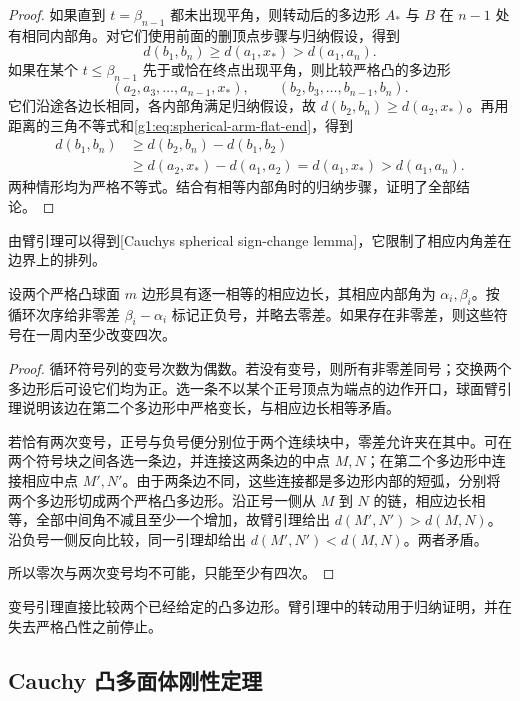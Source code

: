 \begin{proof}
	如果直到 \(t=\beta_{n-1}\) 都未出现平角，则转动后的多边形 \(A_*\) 与 \(B\) 在 \(n-1\) 处有相同内部角。对它们使用前面的删顶点步骤与归纳假设，得到
	\[
		d(b_1,b_n)\ge d(a_1,x_*)>d(a_1,a_n).
	\]
	如果在某个 \(t\le\beta_{n-1}\) 先于或恰在终点出现平角，则比较严格凸的多边形
	\[
		(a_2,a_3,\ldots,a_{n-1},x_*),\qquad
		(b_2,b_3,\ldots,b_{n-1},b_n).
	\]
	它们沿途各边长相同，各内部角满足归纳假设，故 \(d(b_2,b_n)\ge d(a_2,x_*)\)。再用距离的三角不等式和\eqref{g1:eq:spherical-arm-flat-end}，得到
	\begin{align*}
		d(b_1,b_n)
		&\ge d(b_2,b_n)-d(b_1,b_2)\\
		&\ge d(a_2,x_*)-d(a_1,a_2)
		=d(a_1,x_*)>d(a_1,a_n).
	\end{align*}
	两种情形均为严格不等式。结合有相等内部角时的归纳步骤，证明了全部结论。
\end{proof}

由臂引理可以得到[Cauchy\textquotesingle s spherical sign-change lemma]，它限制了相应内角差在边界上的排列。

\begin{lemma}\label{g1:lem:spherical-cauchy-sign}
	设两个严格凸球面 \(m\) 边形具有逐一相等的相应边长，其相应内部角为 \(\alpha_i,\beta_i\)。按循环次序给非零差 \(\beta_i-\alpha_i\) 标记正负号，并略去零差。如果存在非零差，则这些符号在一周内至少改变四次。
\end{lemma}
\begin{proof}
	循环符号列的变号次数为偶数。若没有变号，则所有非零差同号；交换两个多边形后可设它们均为正。选一条不以某个正号顶点为端点的边作开口，球面臂引理说明该边在第二个多边形中严格变长，与相应边长相等矛盾。

	若恰有两次变号，正号与负号便分别位于两个连续块中，零差允许夹在其中。可在两个符号块之间各选一条边，并连接这两条边的中点 \(M,N\)；在第二个多边形中连接相应中点 \(M',N'\)。由于两条边不同，这些连接都是多边形内部的短弧，分别将两个多边形切成两个严格凸多边形。沿正号一侧从 \(M\) 到 \(N\) 的链，相应边长相等，全部中间角不减且至少一个增加，故臂引理给出 \(d(M',N')>d(M,N)\)。沿负号一侧反向比较，同一引理却给出 \(d(M',N')<d(M,N)\)。两者矛盾。

	所以零次与两次变号均不可能，只能至少有四次。
\end{proof}

变号引理直接比较两个已经给定的凸多边形。臂引理中的转动用于归纳证明，并在失去严格凸性之前停止。

\subsection{Cauchy 凸多面体刚性定理}
\label{g1:subsec:E04:04}


